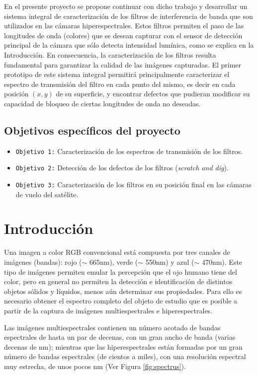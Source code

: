 En el presente proyecto se propone continuar con dicho trabajo y desarrollar un 
sistema integral de caracterización de los filtros de interferencia de banda 
que son utilizados en las cámaras hiperespectrales. Estos filtros permiten el 
paso de las longitudes de onda (colores) que se desean capturar con el sensor 
de detección principal de la cámara que sólo detecta intensidad lumínica, como 
se explica en la Introducción. En consecuencia, la caracterización de los 
filtros resulta fundamental para garantizar la calidad de las imágenes 
capturadas. El primer prototipo de este sistema integral permitirá 
principalmente caracterizar el espectro de transmisión del filtro en 
cada punto del mismo, es decir en cada posición $(x,y)$ de su superficie, y 
encontrar defectos que pudieran modificar su capacidad de bloqueo de ciertas 
longitudes de onda no deseadas.

\subsection{Objetivos específicos del proyecto}
\label{sec:introdhiper}
\begin{itemize}
	
	\item \texttt{Objetivo 1:} Caracterización de los espectros de transmisión 
	de los filtros.
	\item \texttt{Objetivo 2:} Detección de los defectos de los filtros 
	(\textit{scratch and dig}).
	\item \texttt{Objetivo 3:} Caracterización de los filtros en su posición 
	final en las cámaras de vuelo 
	del satélite. \end{itemize}
\section{Introducción}

\hspace{0.5cm}Una imagen a color RGB convencional está compuesta por tres 
canales de 
imágenes (bandas): rojo 
($\sim$ 665nm), verde ($\sim$ 550nm) y azul ($\sim$ 470nm). Este tipo de 
imágenes permiten emular la percepción que el ojo humano tiene del color, pero 
en general no permiten la detección e identificación de distintos objetos 
sólidos y 
líquidos, menos 
aún determinar sus propiedades. Para ello 
es necesario obtener el espectro completo del objeto de estudio que es posible 
a partir de la captura de imágenes multiespectrales e hiperespectrales.

Las imágenes multiespectrales contienen un número acotado de bandas espectrales 
de hasta un par de decenas, con un gran ancho de banda (varias decenas de nm); 
mientras que las hiperespectrales están formadas por un gran número de bandas 
espectrales (de cientos a miles), con una resolución espectral muy estrecha, de 
unos pocos nm (Ver Figura \ref{fig:spectrus}).


